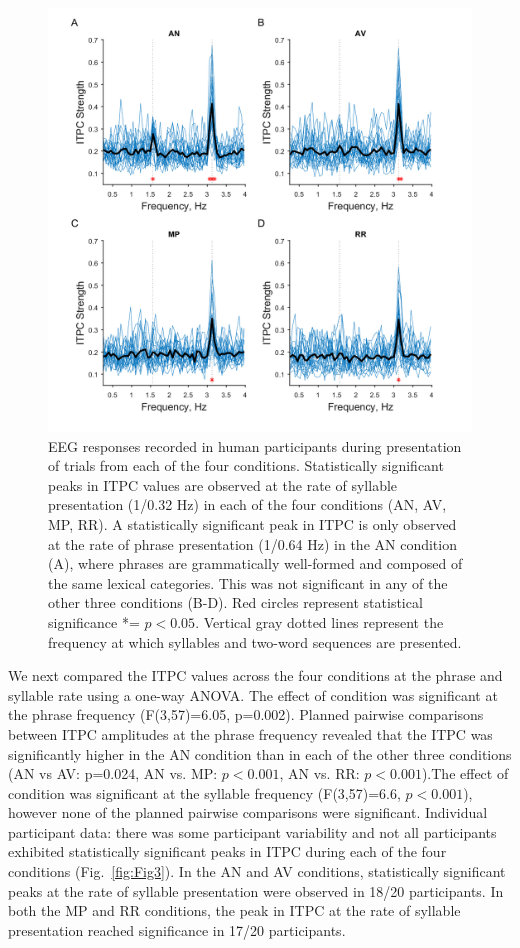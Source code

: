 \documentclass[10pt,letterpaper]{article}
\begin{document}
\begin{figure}[tbhp]
\includegraphics[width=\linewidth]{Grand_average_ITPC_for_all_phrase_conditions.png}
\caption{EEG responses recorded in human participants during presentation of trials from each of the four conditions. Statistically significant peaks in ITPC values are observed at the rate of syllable presentation (1/0.32 Hz) in each of the four conditions (AN, AV, MP, RR). A statistically significant peak in ITPC is only observed at the rate of phrase presentation (1/0.64 Hz) in the AN condition (A), where phrases are grammatically well-formed and composed of the same  lexical categories. This was not significant in any of the other three conditions (B-D). Red circles represent statistical significance *= $p<0.05$. Vertical gray dotted lines represent the frequency at which syllables and two-word sequences are presented.}
\label{fig:Fig2}
\end{figure}
\color{blue}
We next compared the ITPC values across the four conditions at the phrase and syllable rate using a one-way ANOVA. The effect of condition was significant at the phrase frequency (F(3,57)=6.05, p=0.002). Planned pairwise comparisons between ITPC amplitudes at the phrase frequency revealed that the ITPC was significantly higher in the AN condition than in each of the other three conditions (AN vs AV: p=0.024, AN vs. MP: $p<0.001$, AN vs. RR: $p<0.001$).The effect of condition was significant at the syllable frequency (F(3,57)=6.6, $p<0.001$), however none of the planned pairwise comparisons were significant. 
\color{black}
Individual participant data: there was some participant variability and not all participants exhibited statistically significant peaks in ITPC during each of the four conditions (Fig.~\ref{fig:Fig3}). In the AN and AV conditions, statistically significant peaks at the rate of syllable presentation were observed in 18/20 participants. In both the MP and RR conditions, the peak in ITPC at the rate of syllable presentation reached significance in 17/20 participants.
\end{document}
